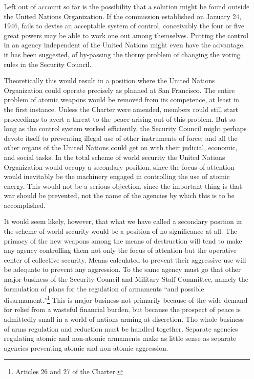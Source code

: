 Left out of account so far is the possibility that a solution might be found outside the United Nations Organization. If the commission established on January 24, 1946, fails to devise an acceptable system of control, conceivably the four or five great powers may be able to work one out among themselves. Putting the control in an agency independent of the United Nations might even have the advantage, it has been suggested, of by-passing the thorny problem of changing the voting rules in the Security Council.

Theoretically this would result in a position where the United Nations Organization could operate precisely as planned at San Francisco. The entire problem of atomic weapons would be removed from its competence, at least in the first instance. Unless the Charter were amended, members could still start proceedings to avert a threat to the peace arising out of this problem. But so long as the control system worked efficiently, the Security Council might perhaps devote itself to preventing illegal use of other instruments of force; and all the other organs of the United Nations could get on with their judicial, economic, and social tasks. In the total scheme of world security the United Nations Organization would occupy a secondary position, since the focus of attention would inevitably be the machinery engaged in controlling the use of atomic energy. This would not be a serious objection, since the important thing is that war should be prevented, not the name of the agencies by which this is to be accomplished.

It would seem likely, however, that what we have called a secondary position in the scheme of world security would be a position of no significance at all. The primacy of the new weapons among the means of destruction will tend to make any agency controlling them not only the focus of attention but the operative center of collective security. Means calculated to prevent their aggressive use will be adequate to prevent any aggression. To the same agency must go that other major business of the Security Council and Military Staff Committee, namely the formulation of plans for the regulation of armaments ``and possible disarmament."\footnote{Articles 26 and 27 of the Charter.} This is major business not primarily because of the wide demand for relief from a wasteful financial burden, but because the prospect of peace is admittedly small in a world of nations arming at discretion. Tho whole business of arms regulation and reduction must be handled together. Separate agencies regulating atomic and non-atomic armaments make as little sense as separate agencies preventing atomic and non-atomic aggression.

